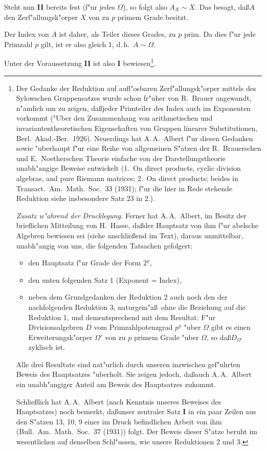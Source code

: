 \documentclass[12pt,a4paper]{article}
\theoremstyle{plain}
\begin{document}
Steht nun \textbf{II} bereits fest (f"ur jedes $\Omega$), so folgt also $A_X \sim X$. Das besagt, da\ss $A$ den Zerf"allungsk"orper $X$ von zu $p$ primem Grade besitzt.

Der Index von $A$ ist daher, als Teiler dieses Grades, zu $p$ prim. Da dies f"ur jede Primzahl $p$ gilt, ist er also gleich 1, d.\,h.\ $A \sim \Omega$.

Unter der Voraussetzung \textbf{II} ist also \textbf{I} bewiesen\footnote{Der Gedanke der Reduktion auf aufl"osbaren Zerf"allungsk"orper mittels des Sylowschen Gruppensatzes wurde schon fr"uher von R.\ Brauer angewandt, n"amlich um zu zeigen, da\ss jeder Primteiler des Index auch im Exponenten vorkommt ("Uber den Zusammenhang von arithmetischen und invariantentheoretischen Eigenschaften von Gruppen linearer Substitutionen, Berl.\ Akad.-Ber.\ 1926). Neuerdings hat A.\,A.\ Albert f"ur diesen Gedanken sowie "uberhaupt f"ur eine Reihe von allgemeinen S"atzen der R.\ Brauerschen und E.\ Noetherschen Theorie einfache von der Darstellungstheorie unabh"angige Beweise entwickelt (1.\ On direct products, cyclic division algebras, and pure Riemann matrices; 2.\ On direct products; beides in Transact.\ Am.\ Math.\ Soc.\ 33 (1931); f"ur die hier in Rede stehende Reduktion siehe insbesondere Satz 23 in 2.).

\medskip
\textit{Zusatz w"ahrend der Drucklegung.} Ferner hat A.\,A.\ Albert, im Besitz der brieflichen Mitteilung von H.\ Hasse, da\ss der Hauptsatz von ihm f"ur abelsche Algebren bewiesen sei (siehe anschlie\ss end im Text), daraus unmittelbar, unabh"angig von uns, die folgenden Tatsachen gefolgert:
\begin{itemize}
\item[a)] den Hauptsatz f"ur Grade der Form $2^\varrho$,
\item[b)] den unten folgenden Satz 1 (Exponent = Index),
\item[c)] neben dem Grundgedanken der Reduktion 2 auch noch den der nachfolgenden Reduktion 3, naturgem"a\ss\ ohne die Beziehung auf die Reduktion 1, und dementsprechend mit dem Resultat: F"ur Divisionsalgebren $D$ vom Primzahlpotenzgrad $p^\varrho$ "uber $\Omega$ gibt es einen Erweiterungsk"orper $\Omega'$ von zu $p$ primem Grade "uber $\Omega$, so da\ss $D_{\Omega'}$ zyklisch ist.
\end{itemize}
Alle drei Resultate sind nat"urlich durch unseren inzwischen gef"uhrten Beweis des Hauptsatzes "uberholt. Sie zeigen jedoch, da\ss auch A.\,A.\ Albert ein unabh"angiger Anteil am Beweis des Hauptsatzes zukommt.

Schlie\ss lich hat A.\,A.\ Albert (nach Kenntnis unseres Beweises des Hauptsatzes) noch bemerkt, da\ss unser zentraler Satz \textbf{I} in ein paar Zeilen aus den S"atzen 13, 10, 9 einer im Druck befindlichen Arbeit von ihm (Bull.\ Am.\ Math.\ Soc.\ 37 (1931)) folgt. Der Beweis dieser S"atze beruht im wesentlichen auf denselben Schl"ussen, wie unsere Reduktionen 2 und 3.}.
\end{document}
